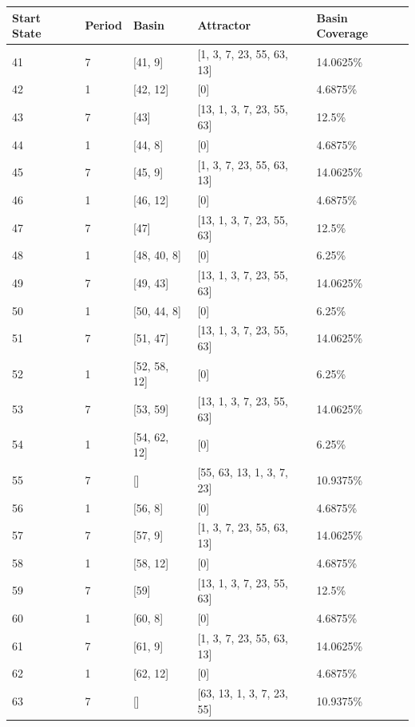 \documentclass[10pt,a4paper]{article}
\begin{document}
\begin{enumerate}
\begin{table}[H]
	\centering
	\begin{tabular}{|l|l|l|l|l|}
		\hline
		\textbf{Start State} & \textbf{Period} & \textbf{Basin} & \textbf{Attractor} & \textbf{Basin Coverage} \\ \hline
		41 & 7 & [41, 9] & [1, 3, 7, 23, 55, 63, 13] & 14.0625\%\\ \hline 
		42 & 1 & [42, 12] & [0] & 4.6875\%\\ \hline 
		43 & 7 & [43] & [13, 1, 3, 7, 23, 55, 63] & 12.5\%\\ \hline 
		44 & 1 & [44, 8] & [0] & 4.6875\%\\ \hline 
		45 & 7 & [45, 9] & [1, 3, 7, 23, 55, 63, 13] & 14.0625\%\\ \hline 
		46 & 1 & [46, 12] & [0] & 4.6875\%\\ \hline 
		47 & 7 & [47] & [13, 1, 3, 7, 23, 55, 63] & 12.5\%\\ \hline 
		48 & 1 & [48, 40, 8] & [0] & 6.25\%\\ \hline 
		49 & 7 & [49, 43] & [13, 1, 3, 7, 23, 55, 63] & 14.0625\%\\ \hline 
		50 & 1 & [50, 44, 8] & [0] & 6.25\%\\ \hline 
		51 & 7 & [51, 47] & [13, 1, 3, 7, 23, 55, 63] & 14.0625\%\\ \hline 
		52 & 1 & [52, 58, 12] & [0] & 6.25\%\\ \hline 
		53 & 7 & [53, 59] & [13, 1, 3, 7, 23, 55, 63] & 14.0625\%\\ \hline 
		54 & 1 & [54, 62, 12] & [0] & 6.25\%\\ \hline 
		55 & 7 & [] & [55, 63, 13, 1, 3, 7, 23] & 10.9375\%\\ \hline 
		56 & 1 & [56, 8] & [0] & 4.6875\%\\ \hline 
		57 & 7 & [57, 9] & [1, 3, 7, 23, 55, 63, 13] & 14.0625\%\\ \hline 
		58 & 1 & [58, 12] & [0] & 4.6875\%\\ \hline 
		59 & 7 & [59] & [13, 1, 3, 7, 23, 55, 63] & 12.5\%\\ \hline 
		60 & 1 & [60, 8] & [0] & 4.6875\%\\ \hline 
		61 & 7 & [61, 9] & [1, 3, 7, 23, 55, 63, 13] & 14.0625\%\\ \hline 
		62 & 1 & [62, 12] & [0] & 4.6875\%\\ \hline 
		63 & 7 & [] & [63, 13, 1, 3, 7, 23, 55] & 10.9375\%\\ \hline 
		
		
	\end{tabular}
\end{table}




\end{enumerate}
\end{document}
